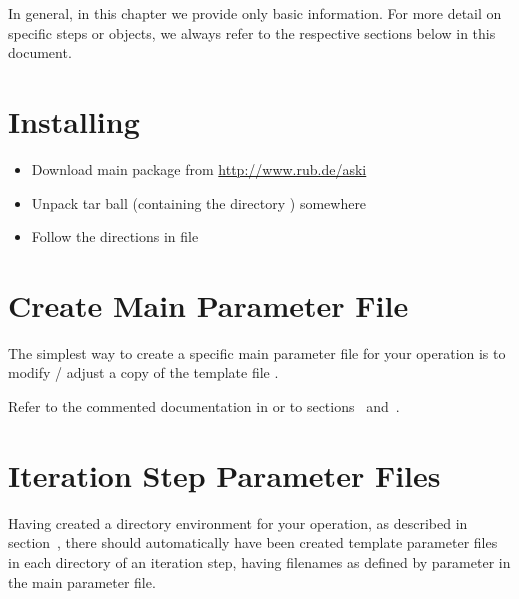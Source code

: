 
%
%
%
In general, in this chapter we provide only basic information. For more detail on 
specific steps or objects, we always refer to the respective sections below in this document.
%
\section{Installing \ASKI} \label{basic_steps,sec:install_ASKI}
%
\begin{itemize}
\item Download main package  from \url{http://www.rub.de/aski}
\item Unpack tar ball (containing the directory ) somewhere
\item Follow the directions in file 
\end{itemize}
%
\section{Create Main Parameter File} \label{basic_steps,sec:main_parfile}
%
The simplest way to create a specific main parameter file for your operation is to modify / adjust 
a copy of the template file . 

Refer to the commented documentation in  or 
to sections~ and~.
%
\section{Iteration Step Parameter Files} \label{basic_steps,sec:iter_parfile}
%
Having created a directory environment for your operation, as described in section~,
there should automatically have been created template
parameter files in each directory of an iteration step, having filenames as defined by
parameter  in the main parameter file.

